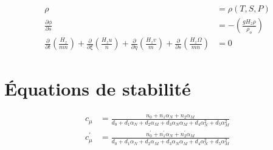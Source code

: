 \begin{subequations}
\begin{align}
        \rho &=\rho(T, S, P) \\
        \frac{\partial \phi}{\partial s} &=-\left(\frac{g H_{z} \rho}{\rho_{o}}\right) \\ 
        \frac{\partial}{\partial t}\left(\frac{H_{z}}{m n}\right)+\frac{\partial}{\partial \xi}\left(\frac{H_{z} u}{n}\right)+\frac{\partial}{\partial \eta}\left(\frac{H_{z} v}{m}\right)+\frac{\partial}{\partial s}\left(\frac{H_{z} \Omega}{m n}\right) & = 0
    \end{align}
\end{subequations}
\section{Équations de stabilité}
\label{sec:eq stabilite}

\begin{subequations}
	\begin{align}
  c_\mu & = \frac{n_0 + n_1 \alpha_N + n_2 \alpha_M}{d_0 + d_1 \alpha_N + d_2 \alpha_M + d_3 \alpha_N \alpha_M + d_4 \alpha_N^2 + d_5 \alpha_M^2} \\
  c_\mu^{'} & = \frac{n_0^{'} + n_1^{'} \alpha_N + n_2^{'} \alpha_M}{d_0 + d_1 \alpha_N + d_2 \alpha_M + d_3 \alpha_N \alpha_M + d_4 \alpha_N^2 + d_5 \alpha_M^2}
  \end{align}
\end{subequations}
